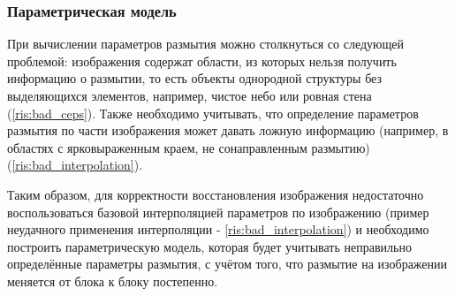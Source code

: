 \newpage
\subsubsection{Параметрическая модель}
При вычислении параметров размытия можно столкнуться со следующей проблемой: 
изображения содержат области, из которых нельзя получить информацию о размытии, 
то есть объекты однородной структуры без выделяющихся элементов, например, 
чистое небо или ровная стена (\ref{ris:bad_ceps}). Также необходимо учитывать, что определение параметров 
размытия по части изображения может давать ложную информацию (например, в областях с ярковыраженным  краем, не сонаправленным размытию) (\ref{ris:bad_interpolation}).

Таким образом, для корректности восстановления изображения недостаточно воспользоваться базовой интерполяцией параметров по изображению (пример неудачного применения интерполяции - \ref{ris:bad_interpolation}) и необходимо построить параметрическую модель, 
которая будет учитывать неправильно определённые параметры размытия, с учётом того, что размытие на изображении меняется от блока к блоку постепенно.

 

